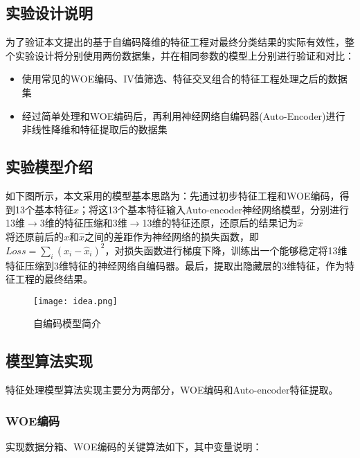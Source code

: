 \subsection{实验设计说明}
为了验证本文提出的基于自编码降维的特征工程对最终分类结果的实际有效性，整个实验设计将分别使用两份数据集，并在相同参数的模型上分别进行验证和对比：

\begin{itemize}
    \item 使用常见的WOE编码、IV值筛选、特征交叉组合的特征工程处理之后的数据集
    \item 经过简单处理和WOE编码后，再利用神经网络自编码器(Auto-Encoder)进行非线性降维和特征提取后的数据集
\end{itemize}

\subsection{实验模型介绍}
如下图所示，本文采用的模型基本思路为：先通过初步特征工程和WOE编码，得到13个基本特征$x$；将这13个基本特征输入Auto-encoder神经网络模型，分别进行13维$\rightarrow$3维的特征压缩和3维$\rightarrow$13维的特征还原，还原后的结果记为$\hat x$\\

将还原前后的$x$和$\hat x$之间的差距作为神经网络的损失函数，即$Loss = \sum\limits_i (x_i-\hat x_i)^2$，对损失函数进行梯度下降，训练出一个能够稳定将13维特征压缩到3维特征的神经网络自编码器。最后，提取出隐藏层的3维特征，作为特征工程的最终结果。

\begin{figure}[H]
    \centering
    \texttt{[image: idea.png]}
    \caption{自编码模型简介}
    \label{fig:idea}
\end{figure}

\subsection{模型算法实现}
特征处理模型算法实现主要分为两部分，WOE编码和Auto-encoder特征提取。

\subsubsection{WOE编码}
实现数据分箱、WOE编码的关键算法如下，其中变量说明：

